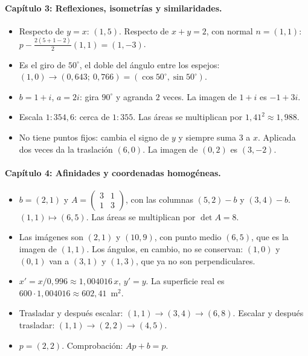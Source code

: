 \paragraph{Capítulo 3: Reflexiones, isometrías y similaridades.}
\begin{itemize}
  \item[\ref{pb:03-1}] Respecto de \(y=x\): \((1,5)\). Respecto de \(x+y=2\), con normal \(n=(1,1)\): \(p-\frac{2(5+1-2)}{2}(1,1)=(1,-3)\).
  \item[\ref{pb:03-2}] Es el giro de \(50^\circ\), el doble del ángulo entre los espejos: \((1,0)\to(0{,}643;\ 0{,}766)=(\cos50^\circ,\sin50^\circ)\).
  \item[\ref{pb:03-3}] \(b=1+i\), \(a=2i\): gira \(90^\circ\) y agranda \(2\) veces. La imagen de \(1+i\) es \(-1+3i\).
  \item[\ref{pb:03-4}] Escala \(1:354{,}6\): cerca de \(1:355\). Las áreas se multiplican por \(1{,}41^2\approx1{,}988\).
  \item[\ref{pb:03-5}] No tiene puntos fijos: cambia el signo de \(y\) y siempre suma \(3\) a \(x\). Aplicada dos veces da la traslación \((6,0)\). La imagen de \((0,2)\) es \((3,-2)\).
\end{itemize}

\paragraph{Capítulo 4: Afinidades y coordenadas homogéneas.}
\begin{itemize}
  \item[\ref{pb:04-1}] \(b=(2,1)\) y \(A=\begin{pmatrix}3&1\\1&3\end{pmatrix}\), con las columnas \((5,2)-b\) y \((3,4)-b\). \((1,1)\mapsto(6,5)\). Las áreas se multiplican por \(\det A=8\).
  \item[\ref{pb:04-2}] Las imágenes son \((2,1)\) y \((10,9)\), con punto medio \((6,5)\), que es la imagen de \((1,1)\). Los ángulos, en cambio, no se conservan: \((1,0)\) y \((0,1)\) van a \((3,1)\) y \((1,3)\), que ya no son perpendiculares.
  \item[\ref{pb:04-3}] \(x'=x/0{,}996\approx1{,}004016\,x\), \(y'=y\). La superficie real es \(600\cdot1{,}004016\approx602{,}41\)~m\(^2\).
  \item[\ref{pb:04-4}] Trasladar y después escalar: \((1,1)\to(3,4)\to(6,8)\). Escalar y después trasladar: \((1,1)\to(2,2)\to(4,5)\).
  \item[\ref{pb:04-5}] \(p=(2,2)\). Comprobación: \(Ap+b=p\).
\end{itemize}

